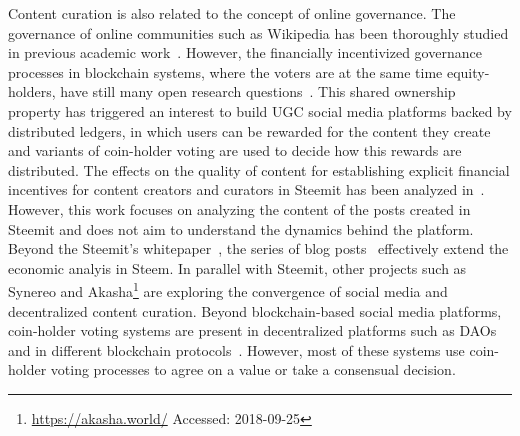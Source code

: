 Content curation is also related to the concept of online governance. The governance of online communities such as Wikipedia has been thoroughly studied in previous academic work~\cite{leskovec2010governance,forte2008scaling}. However, the financially incentivized governance processes in blockchain systems, where the voters are at the same time equity-holders, have still many open research questions~\cite{vitalik,ehrsam}. This shared ownership property has triggered an interest to build UGC social media platforms backed by distributed ledgers, in which users can be rewarded for the content they create and variants of coin-holder voting are used to decide how this rewards are distributed.
The effects on the quality of content for establishing explicit financial incentives for content creators and curators in Steemit has been analyzed in~\cite{thelwall2017can}.
However, this work focuses on analyzing the content of the posts created in Steemit and does not aim to understand the dynamics behind the platform. Beyond the Steemit's whitepaper~\cite{steemit}, the series of blog posts~\cite{curationRewards,selfvoters} effectively extend the economic analyis in Steem. In parallel with Steemit, other projects such as Synereo\cite{synereo} and Akasha\footnote{\url{https://akasha.world/} Accessed: 2018-09-25} are exploring the convergence of social media and decentralized content curation.
Beyond blockchain-based social media platforms, coin-holder voting systems are present in decentralized platforms such as DAOs~\cite{darkdaos} and in different blockchain protocols~\cite{dash,tezos}. However, most of these systems use coin-holder voting processes to agree on a value or take a consensual decision.
